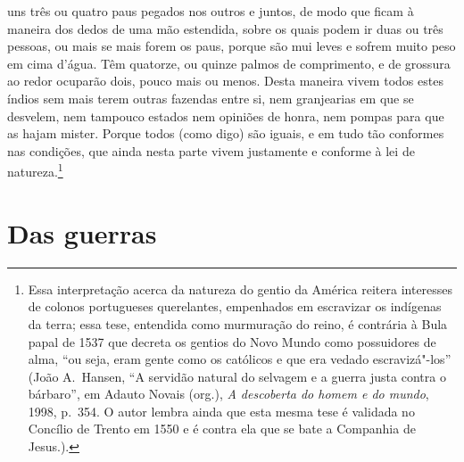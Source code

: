uns três ou quatro paus pegados nos outros e juntos, de modo que ficam
à maneira dos dedos de uma mão estendida, sobre os quais podem ir duas
ou três pessoas, ou mais se mais forem os paus, porque são mui leves e
sofrem muito peso em cima d'água. Têm quatorze, ou
quinze palmos de comprimento, e de grossura ao redor ocuparão dois, pouco
mais ou menos. Desta maneira vivem todos estes índios sem mais terem			%
outras fazendas entre si, nem granjearias em que se desvelem, nem tampouco
estados nem opiniões de honra, nem pompas para que as hajam
mister. Porque todos (como digo) são iguais, e em tudo tão conformes
nas condições, que ainda nesta parte vivem justamente e conforme à lei		%
de natureza.\footnote{ Essa interpretação acerca da natureza do
gentio da América reitera interesses de colonos portugueses querelantes,
empenhados em escravizar os indígenas da terra; essa tese, entendida como
murmuração do reino, é contrária à Bula papal de 1537 que decreta os gentios do
Novo Mundo como possuidores de alma, ``ou seja, eram gente como os católicos e
que era vedado escravizá"-los'' (João A.~Hansen, ``A servidão natural do selvagem e a guerra 
justa contra o bárbaro'', em Adauto Novais (org.), \textit{A descoberta do homem e do mundo}, 1998, p.~354. 
O autor lembra ainda que esta mesma tese é validada no
Concílio de Trento em 1550 e é contra ela que se bate a Companhia de Jesus.).} 		%


\chapter[Das guerras]{Das guerras}						  

